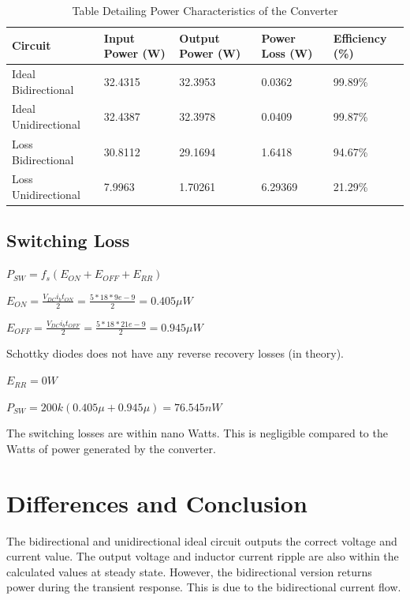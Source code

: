 \documentclass{article}
\begin{document}
\begin{table}
    \centering{}
    \label{tab:power-table}
    \caption{Table Detailing Power Characteristics of the Converter}
    \begin{tabularx}{\textwidth}{| X | X | X | X | X |}
        \hline
        Circuit              & Input Power (W) & Output Power (W) & Power Loss (W) & Efficiency (\%) \\
        \hline
        Ideal Bidirectional  & 32.4315         & 32.3953          & 0.0362         & 99.89\%         \\
        Ideal Unidirectional & 32.4387         & 32.3978          & 0.0409         & 99.87\%         \\
        Loss Bidirectional   & 30.8112         & 29.1694          & 1.6418         & 94.67\%         \\
        Loss Unidirectional  & 7.9963          & 1.70261          & 6.29369        & 21.29\%         \\
        \hline
    \end{tabularx}
\end{table}

\subsection{Switching Loss}
\label{subsec:switching-loss}

$P_{SW} = f_s (E_{ON} + E_{OFF} + E_{RR})$

$E_{ON} = \frac{V_{DC} i_{b} t_{ON}}{2} = \frac{5 * 18 * 9e-9}{2} = 0.405 \mu{W}$

$E_{OFF} = \frac{V_{DC} i_{b} t_{OFF}}{2} = \frac{5 * 18 * 21e-9}{2} = 0.945 \mu{W}$

Schottky diodes does not have any reverse recovery losses (in theory). \cite{schotkley-rr-loss}

$E_{RR} = 0 W$

$P_{SW} = 200k (0.405\mu + 0.945\mu) = 76.545 nW$

The switching losses are within nano Watts.
This is negligible compared to the Watts of power generated by the converter.

\section{Differences and Conclusion}

The bidirectional and unidirectional ideal circuit outputs the correct voltage and current value.
The output voltage and inductor current ripple are also within the calculated values at steady state.
However, the bidirectional version returns power during the transient response.
This is due to the bidirectional current flow.
\end{document}
